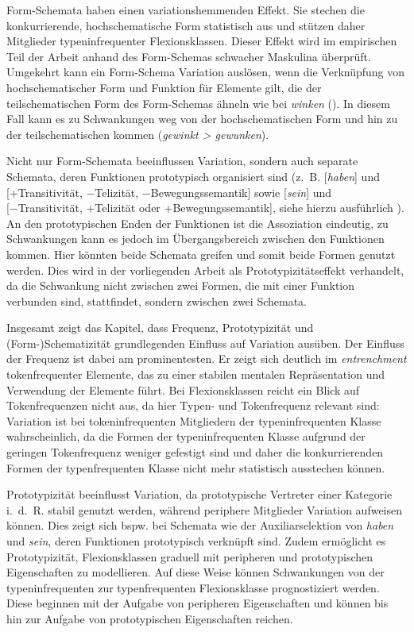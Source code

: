 \begin{sloppypar}
Form-Schemata haben einen variationshemmenden Effekt. Sie stechen die konkurrierende, hochschematische Form statistisch aus und stützen daher Mitglieder typeninfrequenter Flexionsklassen. Dieser Effekt wird im empirischen Teil der Arbeit anhand des Form-Schemas schwacher Maskulina überprüft. Umgekehrt kann ein Form-Schema Variation auslösen, wenn die Verknüpfung von hochschematischer Form und Funktion für Elemente gilt, die der teilschematischen Form des Form-Schemas ähneln wie bei \textit{winken} (\cite{Kopcke.1999}). In diesem Fall kann es zu Schwankungen weg von der hochschematischen Form und hin zu der teilschematischen kommen (\textit{gewinkt > gewunken}).
\end{sloppypar}

\begin{sloppypar}
Nicht nur Form-Schemata beeinflussen Variation, sondern auch separate Schemata, deren Funktionen prototypisch organisiert sind (z.~B. [\textit{haben}] und [+Transitivität, −Telizität, −Bewegungssemantik] sowie [\textit{sein}] und [−Transitivität, +Telizität oder +Bewegungssemantik], siehe hierzu ausführlich ). An den prototypischen Enden der Funktionen ist die Assoziation eindeutig, zu Schwankungen kann es jedoch im Übergangsbereich zwischen den Funktionen kommen. Hier könnten beide Schemata greifen und somit beide Formen genutzt werden. Dies wird in der vorliegenden Arbeit als Prototypizitätseffekt verhandelt, da die Schwankung nicht zwischen zwei Formen, die mit einer Funktion verbunden sind, stattfindet, sondern zwischen zwei Schemata. 
\end{sloppypar}

Insgesamt zeigt das Kapitel, dass Frequenz, Prototypizität und (Form-)Sche\-ma\-ti\-zi\-tät grundlegenden Einfluss auf Variation ausüben. Der Einfluss der Frequenz ist dabei am prominentesten. Er zeigt sich deutlich im \textit{entrenchment} tokenfrequenter Elemente, das zu einer stabilen mentalen Repräsentation und Verwendung der Elemente führt. Bei Flexionsklassen reicht ein Blick auf Tokenfrequenzen nicht aus, da hier Typen- und Tokenfrequenz relevant sind: Variation ist bei tokeninfrequenten Mitgliedern der typeninfrequenten Klasse wahrscheinlich, da die Formen der typeninfrequenten Klasse aufgrund der geringen Tokenfrequenz weniger gefestigt sind und daher die konkurrierenden Formen der typenfrequenten Klasse nicht mehr statistisch ausstechen können. 


Prototypizität beeinflusst Variation, da prototypische Vertreter einer Kategorie i.~d.~R. stabil genutzt werden, während periphere Mitglieder Variation aufweisen können. Dies zeigt sich bspw. bei Schemata wie der Auxiliarselektion von \textit{haben} und \textit{sein}, deren Funktionen prototypisch verknüpft sind. Zudem ermöglicht es Prototypizität, Flexionsklassen graduell mit peripheren und prototypischen Eigenschaften zu modellieren. Auf diese Weise können Schwankungen von der typeninfrequenten zur typenfrequenten Flexionsklasse prognostiziert werden. Diese beginnen mit der Aufgabe von peripheren Eigenschaften und können bis hin zur Aufgabe von prototypischen Eigenschaften reichen. 

